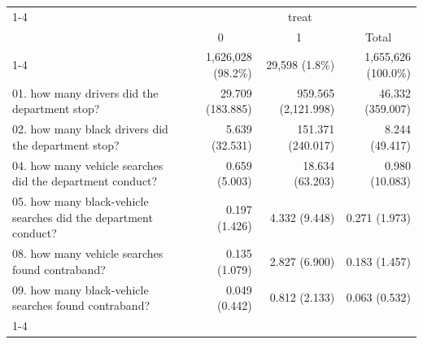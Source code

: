 \documentclass{article}
\begin{document}
\begin{table}[!h]
\centering
\begin{tabular}{llll}
\cline{1-4}
\multicolumn{1}{r}{} &
  \multicolumn{3}{c}{treat} \\
\multicolumn{1}{r}{} &
  \multicolumn{1}{c}{0} &
  \multicolumn{1}{c}{1} &
  \multicolumn{1}{c}{Total} \\
\cline{1-4}
\multicolumn{1}{l}{N} &
  \multicolumn{1}{r}{1,626,028 (98.2\%)} &
  \multicolumn{1}{r}{29,598 (1.8\%)} &
  \multicolumn{1}{r}{1,655,626 (100.0\%)} \\
\multicolumn{1}{l}{01. how many drivers did the department stop?} &
  \multicolumn{1}{r}{29.709 (183.885)} &
  \multicolumn{1}{r}{959.565 (2,121.998)} &
  \multicolumn{1}{r}{46.332 (359.007)} \\
\multicolumn{1}{l}{02. how many black drivers did the department stop?} &
  \multicolumn{1}{r}{5.639 (32.531)} &
  \multicolumn{1}{r}{151.371 (240.017)} &
  \multicolumn{1}{r}{8.244 (49.417)} \\
\multicolumn{1}{l}{04. how many vehicle searches did the department conduct?} &
  \multicolumn{1}{r}{0.659 (5.003)} &
  \multicolumn{1}{r}{18.634 (63.203)} &
  \multicolumn{1}{r}{0.980 (10.083)} \\
\multicolumn{1}{l}{05. how many black-vehicle searches did the department conduct?} &
  \multicolumn{1}{r}{0.197 (1.426)} &
  \multicolumn{1}{r}{4.332 (9.448)} &
  \multicolumn{1}{r}{0.271 (1.973)} \\
\multicolumn{1}{l}{08. how many vehicle searches found contraband?} &
  \multicolumn{1}{r}{0.135 (1.079)} &
  \multicolumn{1}{r}{2.827 (6.900)} &
  \multicolumn{1}{r}{0.183 (1.457)} \\
\multicolumn{1}{l}{09. how many black-vehicle searches found contraband?} &
  \multicolumn{1}{r}{0.049 (0.442)} &
  \multicolumn{1}{r}{0.812 (2.133)} &
  \multicolumn{1}{r}{0.063 (0.532)} \\
\cline{1-4}
\end{tabular}
\end{table}
\end{document}
